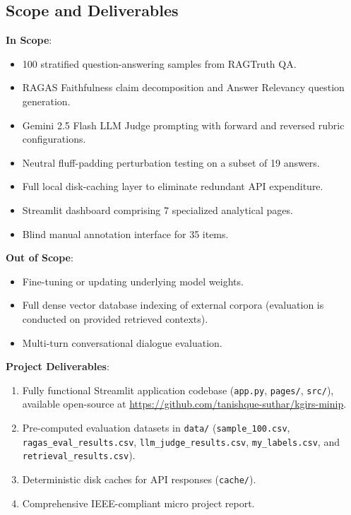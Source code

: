 \documentclass[11pt,a4paper]{article}
\begin{document}
\subsection{Scope and Deliverables}
\textbf{In Scope}:
\begin{itemize}[leftmargin=*]
    \item 100 stratified question-answering samples from RAGTruth QA.
    \item RAGAS Faithfulness claim decomposition and Answer Relevancy question generation.
    \item Gemini 2.5 Flash LLM Judge prompting with forward and reversed rubric configurations.
    \item Neutral fluff-padding perturbation testing on a subset of 19 answers.
    \item Full local disk-caching layer to eliminate redundant API expenditure.
    \item Streamlit dashboard comprising 7 specialized analytical pages.
    \item Blind manual annotation interface for 35 items.
\end{itemize}

\textbf{Out of Scope}:
\begin{itemize}[leftmargin=*]
    \item Fine-tuning or updating underlying model weights.
    \item Full dense vector database indexing of external corpora (evaluation is conducted on provided retrieved contexts).
    \item Multi-turn conversational dialogue evaluation.
\end{itemize}

\textbf{Project Deliverables}:
\begin{enumerate}[leftmargin=*]
    \item Fully functional Streamlit application codebase (\texttt{app.py}, \texttt{pages/}, \texttt{src/}), available open-source at \url{https://github.com/tanishque-suthar/kgirs-minip}.
    \item Pre-computed evaluation datasets in \texttt{data/} (\texttt{sample\_100.csv}, \texttt{ragas\_eval\_results.csv}, \texttt{llm\_judge\_results.csv}, \texttt{my\_labels.csv}, and \texttt{retrieval\_results.csv}).
    \item Deterministic disk caches for API responses (\texttt{cache/}).
    \item Comprehensive IEEE-compliant micro project report.
\end{enumerate}
\end{document}
